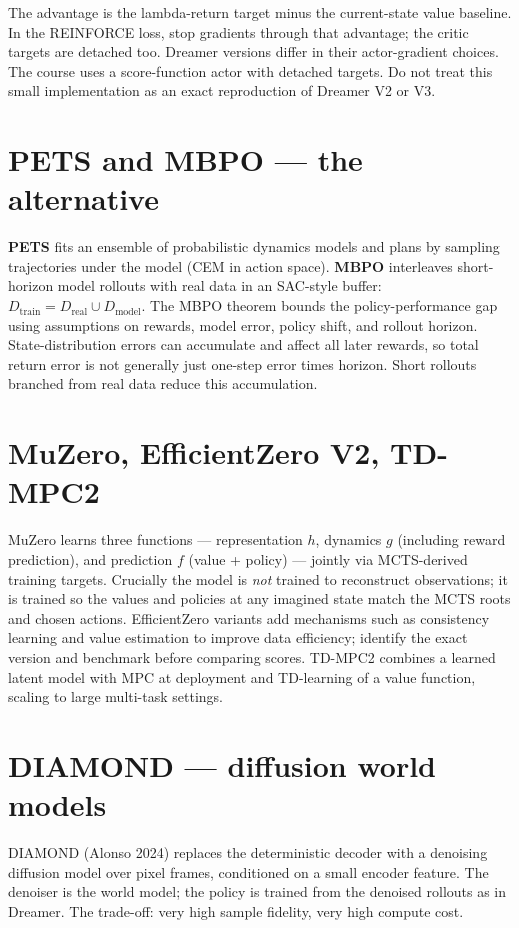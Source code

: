 \documentclass[11pt,oneside]{scrbook}
\begin{document}
The advantage is the lambda-return target minus the current-state value baseline. In the REINFORCE loss, stop gradients through that advantage; the critic targets are detached too. Dreamer versions differ in their actor-gradient choices. The course uses a score-function actor with detached targets. Do not treat this small implementation as an exact reproduction of Dreamer V2 or V3.

\section{PETS and MBPO --- the alternative}

\textbf{PETS} fits an ensemble of probabilistic dynamics models and plans by sampling
trajectories under the model (CEM in action space). \textbf{MBPO} interleaves
short-horizon model rollouts with real data in an SAC-style buffer:
$D_{\mathrm{train}} = D_{\mathrm{real}} \cup D_{\mathrm{model}}$. The MBPO theorem bounds the
policy-performance gap using assumptions on rewards, model error, policy shift, and rollout horizon. State-distribution errors can accumulate and affect all later rewards, so total return error is not generally just one-step error times horizon. Short rollouts branched from real data reduce this accumulation.

\section{MuZero, EfficientZero V2, TD-MPC2}

MuZero learns three functions --- representation $h$, dynamics $g$ (including reward prediction), and prediction $f$ (value + policy) --- jointly via MCTS-derived training targets. Crucially the model is
\emph{not} trained to reconstruct observations; it is trained so the values and policies
at any imagined state match the MCTS roots and chosen actions. EfficientZero variants add mechanisms such as consistency learning and value estimation to improve data efficiency; identify the exact version and benchmark before comparing scores. TD-MPC2 combines a learned latent model with MPC at deployment
and TD-learning of a value function, scaling to large multi-task settings.

\section{DIAMOND --- diffusion world models}

DIAMOND (Alonso 2024) replaces the deterministic decoder with a denoising diffusion model
over pixel frames, conditioned on a small encoder feature. The denoiser is the world model;
the policy is trained from the denoised rollouts as in Dreamer. The trade-off: very high
sample fidelity, very high compute cost.
\end{document}
